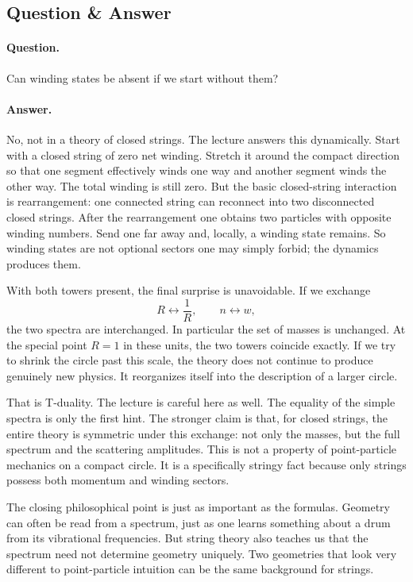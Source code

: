 \subsection{Question \& Answer}

\paragraph{Question.} Can winding states be absent if we start without them?

\paragraph{Answer.} No, not in a theory of closed strings. The lecture answers this dynamically. Start with a closed string of zero net winding. Stretch it around the compact direction so that one segment effectively winds one way and another segment winds the other way. The total winding is still zero. But the basic closed-string interaction is rearrangement: one connected string can reconnect into two disconnected closed strings. After the rearrangement one obtains two particles with opposite winding numbers. Send one far away and, locally, a winding state remains. So winding states are not optional sectors one may simply forbid; the dynamics produces them.

With both towers present, the final surprise is unavoidable. If we exchange
\begin{equation}
R \longleftrightarrow \frac{1}{R},
\qquad
n \longleftrightarrow w,
\end{equation}
the two spectra are interchanged. In particular the set of masses is unchanged. At the special point \(R=1\) in these units, the two towers coincide exactly. If we try to shrink the circle past this scale, the theory does not continue to produce genuinely new physics. It reorganizes itself into the description of a larger circle.

That is T-duality. The lecture is careful here as well. The equality of the simple spectra is only the first hint. The stronger claim is that, for closed strings, the entire theory is symmetric under this exchange: not only the masses, but the full spectrum and the scattering amplitudes. This is not a property of point-particle mechanics on a compact circle. It is a specifically stringy fact because only strings possess both momentum and winding sectors.

The closing philosophical point is just as important as the formulas. Geometry can often be read from a spectrum, just as one learns something about a drum from its vibrational frequencies. But string theory also teaches us that the spectrum need not determine geometry uniquely. Two geometries that look very different to point-particle intuition can be the same background for strings.

